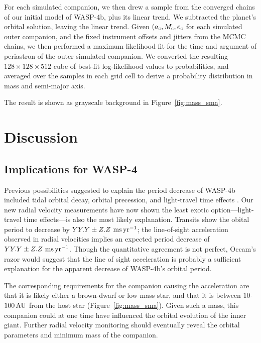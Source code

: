 \documentclass[12pt,twocolumn,tighten]{aastex62}
\begin{document}
For each simulated companion, we then drew a sample from the converged
chains of our initial model of WASP-4b, plus its linear trend. We
subtracted the planet's orbital solution, leaving the linear trend.
Given $(a_{\rm c}, M_{\rm c}, e_{\rm c}$ for each simulated outer
companion, and the fixed instrument offsets and jitters from the MCMC
chains, we then performed a maximum likelihood fit for the time and
argument of periastron of the outer simulated companion.  We converted
the resulting $128\times128\times512$ cube of best-fit log-likelihood
values to probabilities, and averaged over the samples in each grid
cell to derive a probability distribution in mass and semi-major axis.

The result is shown as grayscale background in
Figure~\ref{fig:mass_sma}.



\section{Discussion}
\label{sec:discussion}

\subsection{Implications for WASP-4}
Previous possibilities suggested to explain the period decrease of
WASP-4b included tidal orbital decay, orbital precession, and
light-travel time effects \citep{bouma_wasp4b_2019}.  Our new radial
velocity measurements have now shown the least exotic
option---light-travel time effects---is also the most likely
explanation.  Transits show the obital period to decrease by $YY.Y \pm
Z.Z~{\rm ms}\,{\rm yr}^{-1}$; the line-of-sight acceleration observed
in radial velocities implies an expected period decrease of $YY.Y \pm
Z.Z~{\rm ms}\,{\rm yr}^{-1}$.  
Though the quantitative agreement is not perfect, Occam's razor would
suggest that the line of sight acceleration is probably a sufficient
explanation for the apparent decrease of WASP-4b's orbital period.

The corresponding requirements for the companion causing the
acceleration are that it is likely either a brown-dwarf or low mass
star, and that it is between $10$-$100\,{\rm AU}$ from the host star
(Figure~\ref{fig:mass_sma}).
Given such a mass, this companion could at one time have influenced
the orbital evolution of the inner giant.
Further radial velocity monitoring should eventually reveal the
orbital parameters and minimum mass of the companion.
\end{document}
